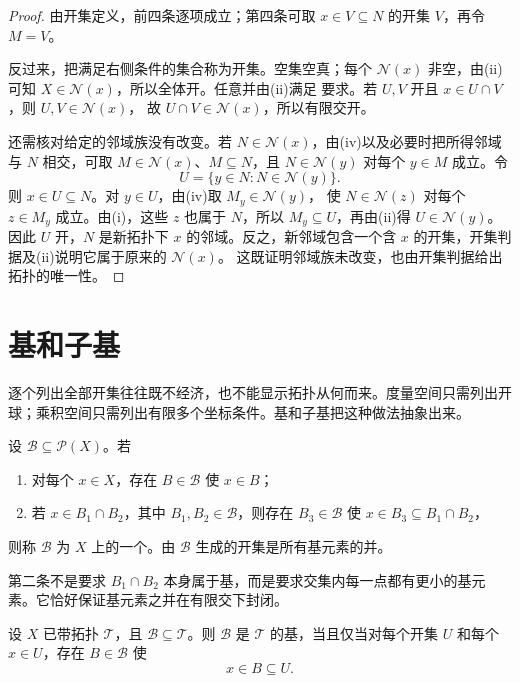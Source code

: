 \begin{proof}
由开集定义，前四条逐项成立；第四条可取 \(x\in V\subseteq N\) 的开集 \(V\)，再令 \(M=V\)。

反过来，把满足右侧条件的集合称为开集。空集空真；每个 \(\mathcal N(x)\)
非空，由(ii)可知 \(X\in\mathcal N(x)\)，所以全体开。任意并由(ii)满足
要求。若 \(U,V\) 开且 \(x\in U\cap V\)，则 \(U,V\in\mathcal N(x)\)，
故 \(U\cap V\in\mathcal N(x)\)，所以有限交开。

还需核对给定的邻域族没有改变。若 \(N\in\mathcal N(x)\)，由(iv)以及必要时把所得邻域与 \(N\) 相交，可取 \(M\in\mathcal N(x)\)、\(M\subseteq N\)，且 \(N\in\mathcal N(y)\) 对每个 \(y\in M\) 成立。令
\[
 U=\{y\in N:N\in\mathcal N(y)\}.
\]
则 \(x\in U\subseteq N\)。对 \(y\in U\)，由(iv)取 \(M_y\in\mathcal N(y)\)，
使 \(N\in\mathcal N(z)\) 对每个 \(z\in M_y\) 成立。由(i)，这些 \(z\)
也属于 \(N\)，所以 \(M_y\subseteq U\)，再由(ii)得 \(U\in\mathcal N(y)\)。
因此 \(U\) 开，\(N\) 是新拓扑下 \(x\) 的邻域。反之，新邻域包含一个含
\(x\) 的开集，开集判据及(ii)说明它属于原来的 \(\mathcal N(x)\)。
这既证明邻域族未改变，也由开集判据给出拓扑的唯一性。
\end{proof}

\section{基和子基}

逐个列出全部开集往往既不经济，也不能显示拓扑从何而来。度量空间只需列出开球；乘积空间只需列出有限多个坐标条件。基和子基把这种做法抽象出来。

\begin{definition}[拓扑基]
设 \(\mathcal B\subseteq\mathcal P(X)\)。若
\begin{enumerate}[label=\textup{(\roman*)}]
 \item 对每个 \(x\in X\)，存在 \(B\in\mathcal B\) 使 \(x\in B\)；
 \item 若 \(x\in B_1\cap B_2\)，其中 \(B_1,B_2\in\mathcal B\)，则存在 \(B_3\in\mathcal B\) 使
 \(x\in B_3\subseteq B_1\cap B_2\)，
\end{enumerate}
则称 \(\mathcal B\) 为 \(X\) 上的一个。由 \(\mathcal B\) 生成的开集是所有基元素的并。
\end{definition}

第二条不是要求 \(B_1\cap B_2\) 本身属于基，而是要求交集内每一点都有更小的基元素。它恰好保证基元素之并在有限交下封闭。

\begin{proposition}[判定一族集合是否为给定拓扑的基]
\label{prop:basis-neighborhood-criterion}
设 \(X\) 已带拓扑 \(\mathcal T\)，且 \(\mathcal B\subseteq\mathcal T\)。则 \(\mathcal B\) 是 \(\mathcal T\) 的基，当且仅当对每个开集 \(U\) 和每个 \(x\in U\)，存在 \(B\in\mathcal B\) 使
\[
 x\in B\subseteq U.
\]
\end{proposition}

